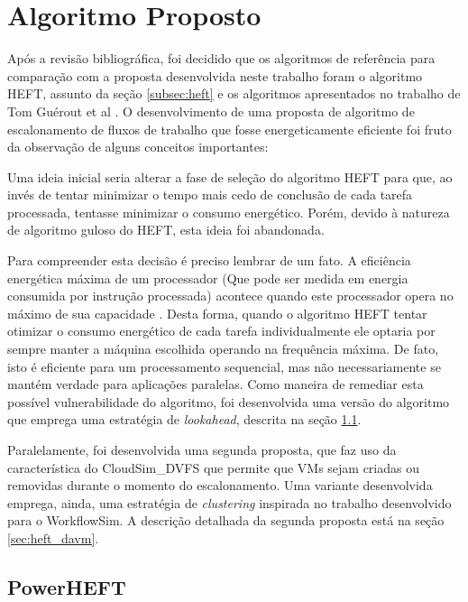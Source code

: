 \chapter{Algoritmo Proposto}
\label{cap:algoritmo}

Após a revisão bibliográfica, foi decidido que os algoritmos de referência para
comparação com a proposta desenvolvida neste trabalho foram o algoritmo HEFT,
assunto da seção \ref{subsec:heft} e os algoritmos apresentados no trabalho de
Tom Guérout et al \cite{guerout:energy_aware_simulation}. O desenvolvimento de
uma proposta de algoritmo de escalonamento de fluxos de trabalho que fosse
energeticamente eficiente foi fruto da observação de alguns conceitos
importantes:

Uma ideia inicial seria alterar a fase de seleção do algoritmo HEFT para que, ao
invés de tentar minimizar o tempo mais cedo de conclusão de cada tarefa
processada, tentasse minimizar o consumo energético. Porém, devido à natureza de
algoritmo guloso do HEFT, esta ideia foi abandonada.

Para compreender esta decisão é preciso lembrar de um fato. A eficiência
energética máxima de um processador (Que pode ser medida em energia consumida
por instrução processada) acontece quando este processador opera no máximo de
sua capacidade \cite{barroso:case_energy_proportional}. Desta forma, quando o
algoritmo HEFT tentar otimizar o consumo energético de cada tarefa
individualmente ele optaria por sempre manter a máquina escolhida operando na
frequência máxima. De fato, isto é eficiente para um processamento sequencial,
mas não necessariamente se mantém verdade para aplicações paralelas. Como
maneira de remediar esta possível vulnerabilidade do algoritmo, foi desenvolvida
uma versão do algoritmo que emprega uma estratégia de \emph{lookahead}, descrita
na seção \ref{sec:proposta_inicial}.

Paralelamente, foi desenvolvida uma segunda proposta, que faz uso da
característica do CloudSim\_DVFS que permite que VMs sejam criadas ou removidas
durante o momento do escalonamento. Uma variante desenvolvida emprega, ainda,
uma estratégia de \emph{clustering} inspirada no trabalho desenvolvido para o
WorkflowSim. A descrição detalhada da segunda proposta está na seção
\ref{sec:heft_davm}.

\section{PowerHEFT}
\label{sec:proposta_inicial}

